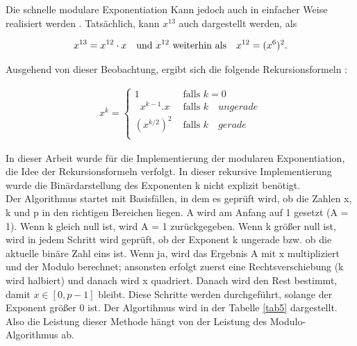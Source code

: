 Die schnelle modulare Exponentiation Kann jedoch auch in einfacher Weise realisiert werden \cite{langME}. Tatsächlich, kann \( x^{13}\) auch dargestellt werden, als 

\begin{align*}
    x^{13} = x^{12} \cdot x \quad \text{und \( x^{12}\) weiterhin als} \quad x^{12} = (x^{6})^2.
\end{align*}

Ausgehend von dieser Beobachtung, ergibt sich die folgende Rekursionsformeln \cite{langME}:

\begin{ceqn}
\begin{align*}
     x^k = \begin{cases}
     1    & \text{ falls } k = 0 \\
    \;\;x^{k-1}.x  & \text{ falls } k \quad ungerade \\
    (x^{k/2})^2     & \text{ falls } k \quad gerade \\
    \end{cases}
\end{align*}
\end{ceqn}

In dieser Arbeit wurde für die Implementierung der modularen Exponentiation, die Idee der Rekursionsformeln verfolgt.
In dieser rekursive Implementierung wurde die Binärdarstellung des Exponenten k nicht explizit benötigt.\\

Der Algorithmus startet mit Basisfällen, in dem es geprüft wird, ob die Zahlen x, k und p in den richtigen Bereichen liegen. 
A wird am Anfang auf 1 gesetzt (A = 1). Wenn k gleich null ist, wird A = 1 zurückgegeben. 
Wenn k größer null ist, wird in jedem Schritt wird geprüft, ob der Exponent k ungerade bzw. ob die aktuelle binäre Zahl eins ist. 
Wenn ja, wird das Ergebnis A mit x multipliziert und der Modulo berechnet; ansonsten erfolgt zuerst eine
Rechtsverschiebung (k wird halbiert) und danach wird x quadriert. Danach wird den Rest bestimmt, damit $x \in [0, p-1] $ bleibt.
Diese Schritte werden durchgeführt, solange der Exponent größer 0 ist. Der Algortihmus wird in der Tabelle \ref{tab5} dargestellt.
Also die Leistung dieser Methode hängt von der Leistung des Modulo-Algorithmus ab.

